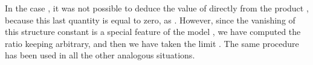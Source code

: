 \documentclass[a4paper,12pt]{report}
\begin{document}
In the case \coordHE{}, it was not possible to deduce the value of
\coordHE{} directly from the product \coordHE{}, because this last quantity is equal to zero, as \coordHE{}. However, since the vanishing of this structure constant is a special feature
of the model \coordHE{}, we have computed the ratio \coordHE{} keeping \coordHE{} arbitrary, and then we have taken the limit
\coordHE{}. The same procedure has been used in all the other analogous situations.
\end{document}
